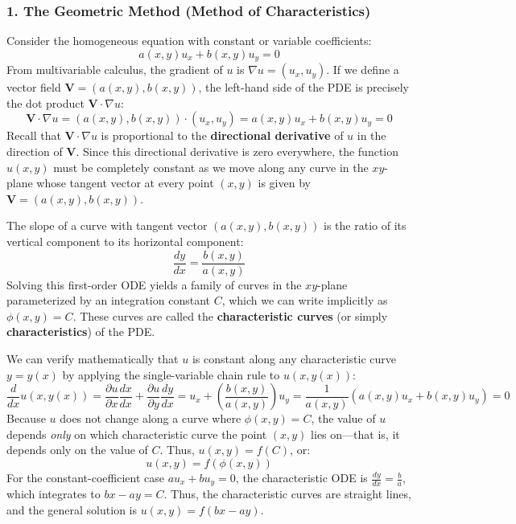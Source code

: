 \documentclass[11pt]{article}
\begin{document}
\subsubsection*{1. The Geometric Method (Method of Characteristics)}
Consider the homogeneous equation with constant or variable coefficients:
\[
a(x, y)u_x + b(x, y)u_y = 0
\]
From multivariable calculus, the gradient of $u$ is $\nabla u = (u_x, u_y)$. If we define a vector field $\mathbf{V} = (a(x, y), b(x, y))$, the left-hand side of the PDE is precisely the dot product $\mathbf{V} \cdot \nabla u$:
\[
\mathbf{V} \cdot \nabla u = (a(x, y), b(x, y)) \cdot (u_x, u_y) = a(x, y)u_x + b(x, y)u_y = 0
\]
Recall that $\mathbf{V} \cdot \nabla u$ is proportional to the \textbf{directional derivative} of $u$ in the direction of $\mathbf{V}$. Since this directional derivative is zero everywhere, the function $u(x, y)$ must be completely constant as we move along any curve in the $xy$-plane whose tangent vector at every point $(x, y)$ is given by $\mathbf{V} = (a(x, y), b(x, y))$.

The slope of a curve with tangent vector $(a(x, y), b(x, y))$ is the ratio of its vertical component to its horizontal component:
\[
\frac{dy}{dx} = \frac{b(x, y)}{a(x, y)}
\]
Solving this first-order ODE yields a family of curves in the $xy$-plane parameterized by an integration constant $C$, which we can write implicitly as $\phi(x, y) = C$. These curves are called the \textbf{characteristic curves} (or simply \textbf{characteristics}) of the PDE. 

We can verify mathematically that $u$ is constant along any characteristic curve $y = y(x)$ by applying the single-variable chain rule to $u(x, y(x))$:
\[
\frac{d}{dx}u(x, y(x)) = \frac{\partial u}{\partial x}\frac{dx}{dx} + \frac{\partial u}{\partial y}\frac{dy}{dx} = u_x + \left(\frac{b(x, y)}{a(x, y)}\right)u_y = \frac{1}{a(x, y)}\left(a(x, y)u_x + b(x, y)u_y\right) = 0
\]
Because $u$ does not change along a curve where $\phi(x, y) = C$, the value of $u$ depends \emph{only} on which characteristic curve the point $(x, y)$ lies on—that is, it depends only on the value of $C$. Thus, $u(x, y) = f(C)$, or:
\[
u(x, y) = f(\phi(x, y))
\]
For the constant-coefficient case $au_x + bu_y = 0$, the characteristic ODE is $\frac{dy}{dx} = \frac{b}{a}$, which integrates to $bx - ay = C$. Thus, the characteristic curves are straight lines, and the general solution is $u(x, y) = f(bx - ay)$.
\end{document}

